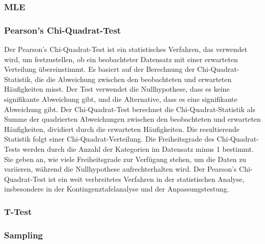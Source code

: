 \documentclass[letterpaper, titlepage]{article}
\begin{document}
\vspace*{0.35cm}

\subsubsection{MLE}\label{MLE}

\vspace*{0.35cm}

\subsubsection{Pearson's Chi-Quadrat-Test}\label{Pearson's Chi-Quadrat-Test}
Der Pearson's Chi-Quadrat-Test ist ein statistisches Verfahren, das verwendet wird, um festzustellen, ob ein beobachteter Datensatz mit einer erwarteten Verteilung übereinstimmt. Es basiert auf der Berechnung der Chi-Quadrat-Statistik, die die Abweichung zwischen den beobachteten und erwarteten Häufigkeiten misst. Der Test verwendet die Nullhypothese, dass es keine signifikante Abweichung gibt, und die Alternative, dass es eine signifikante Abweichung gibt. Der Chi-Quadrat-Test berechnet die Chi-Quadrat-Statistik als Summe der quadrierten Abweichungen zwischen den beobachteten und erwarteten Häufigkeiten, dividiert durch die erwarteten Häufigkeiten. Die resultierende Statistik folgt einer Chi-Quadrat-Verteilung. Die Freiheitsgrade des Chi-Quadrat-Tests werden durch die Anzahl der Kategorien im Datensatz minus 1 bestimmt. Sie geben an, wie viele Freiheitsgrade zur Verfügung stehen, um die Daten zu variieren, während die Nullhypothese aufrechterhalten wird. Der Pearson's Chi-Quadrat-Test ist ein weit verbreitetes Verfahren in der statistischen Analyse, insbesondere in der Kontingenztafelanalyse und der Anpassungstestung.

\vspace{0.35cm}

\subsubsection{T-Test}\label{T-Test}

\vspace{0.35cm}

\subsubsection{Sampling}\label{Sampling}

\vspace{0.35cm}
\end{document}
